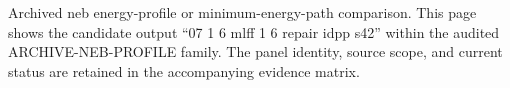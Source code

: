 Archived neb energy-profile or minimum-energy-path comparison. This page shows the candidate output ``07 1 6 mlff 1 6 repair idpp s42'' within the audited ARCHIVE-NEB-PROFILE family. The panel identity, source scope, and current status are retained in the accompanying evidence matrix.
